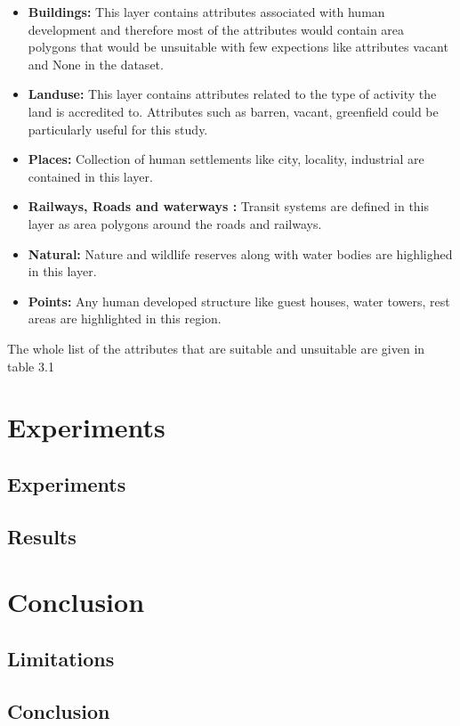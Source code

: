 \documentclass[a4paper,12pt]{Classes/RoboticsLaTeX}
\begin{document}
	\begin{itemize}
		\item \textbf{Buildings: } This layer contains attributes associated with human development and therefore most of the attributes would contain area polygons that would be unsuitable with few expections 
		like attributes vacant and None in the dataset.
		\item \textbf{Landuse: } This layer contains attributes related to the type of activity the land is accredited to. Attributes such as barren, vacant, greenfield could be particularly useful for this study.
		\item \textbf{Places: } Collection of human settlements like city, locality, industrial are contained in this layer.
		\item \textbf{Railways, Roads and waterways : } Transit systems are defined in this layer as area polygons around the roads and railways.
		\item \textbf{Natural: } Nature and wildlife reserves along with water bodies are highlighed in this layer.
		\item \textbf{Points: } Any human developed structure like guest houses, water towers, rest areas are highlighted in this region.
	\end{itemize}

	The whole list of the attributes that are suitable and unsuitable are given in table 3.1

	
	\chapter{Experiments}

	\section{Experiments}
	\section{Results}

	\chapter{Conclusion}
	\label{chap:conclusion}
	\section{Limitations}
	\section{Conclusion}
\end{document}
